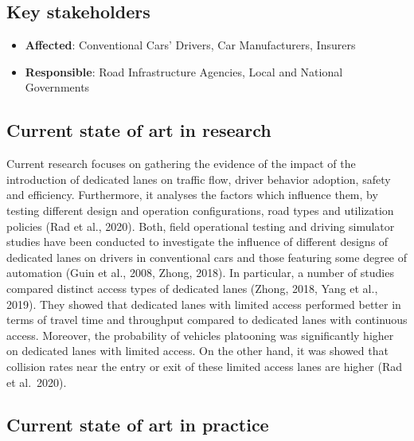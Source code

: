 \documentclass[
]{book}
\providecommand{\tightlist}{%
  \setlength{\itemsep}{0pt}\setlength{\parskip}{0pt}}
\begin{document}
\hypertarget{key-stakeholders}{%
\subsection*{Key stakeholders}\label{key-stakeholders}}

\begin{itemize}
\tightlist
\item
  \textbf{Affected}: Conventional Cars' Drivers, Car Manufacturers, Insurers
\item
  \textbf{Responsible}: Road Infrastructure Agencies, Local and National Governments
\end{itemize}

\hypertarget{current-state-of-art-in-research}{%
\subsection*{Current state of art in research}\label{current-state-of-art-in-research}}

Current research focuses on gathering the evidence of the impact of the introduction of dedicated lanes on traffic flow, driver behavior adoption, safety and efficiency. Furthermore, it analyses the factors which influence them, by testing different design and operation configurations, road types and utilization policies (Rad et al., 2020). Both, field operational testing and driving simulator studies have been conducted to investigate the influence of different designs of dedicated lanes on drivers in conventional cars and those featuring some degree of automation (Guin et al., 2008, Zhong, 2018). In particular, a number of studies compared distinct access types of dedicated lanes (Zhong, 2018, Yang et al., 2019). They showed that dedicated lanes with limited access performed better in terms of travel time and throughput compared to dedicated lanes with continuous access. Moreover, the probability of vehicles platooning was significantly higher on dedicated lanes with limited access. On the other hand, it was showed that collision rates near the entry or exit of these limited access lanes are higher (Rad et al.~2020).

\hypertarget{current-state-of-art-in-practice}{%
\subsection*{Current state of art in practice}\label{current-state-of-art-in-practice}}
\end{document}
